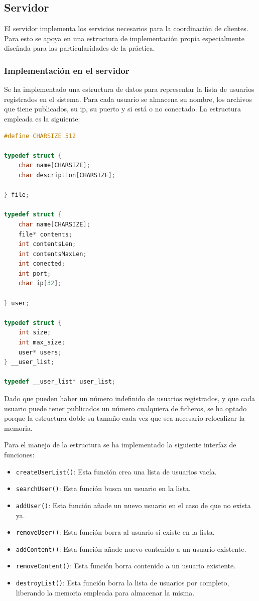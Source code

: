 \documentclass[]{article}
\begin{document}
\subsection{Servidor}
\label{subsec:servidor}
El servidor implementa los servicios necesarios para la coordinación de clientes. Para esto se apoya en una estructura de implementación propia especialmente diseñada para las particularidades de la práctica. 

\subsubsection{Implementación en el servidor}
\label{subsec:implementacion_servidor}
Se ha implementado una estructura de datos para representar la lista de usuarios registrados en el sistema. Para cada usuario se almacena su nombre, los archivos que tiene publicados, su ip, su puerto y si está o no conectado. La estructura empleada es la siguiente: 

\begin{lstlisting}[language=C, caption=Estructura de datos para el servidor]
#define CHARSIZE 512

typedef struct {
    char name[CHARSIZE];
    char description[CHARSIZE];

} file;

typedef struct {
    char name[CHARSIZE];
    file* contents;
    int contentsLen;
    int contentsMaxLen;
    int conected;
    int port;
    char ip[32];

} user;

typedef struct {
    int size;
    int max_size;
    user* users;
} __user_list;

typedef __user_list* user_list;

\end{lstlisting}

Dado que pueden haber un número indefinido de usuarios registrados, y que cada usuario puede tener publicados un número cualquiera de ficheros, se ha optado porque la estructura doble su tamaño cada vez que sea necesario relocalizar la memoria.

Para el manejo de la estructura se ha implementado la siguiente interfaz de funciones: 

\begin{itemize}
  \item \texttt{createUserList()}: Esta función crea una lista de usuarios vacía.
  \item \texttt{searchUser()}: Esta función busca un usuario en la lista.
  \item \texttt{addUser()}: Esta función añade un nuevo usuario en el caso de que no exista ya.
  \item \texttt{removeUser()}: Esta función borra al usuario si existe en la lista.
  \item \texttt{addContent()}: Esta función añade nuevo contenido a un usuario existente.
  \item \texttt{removeContent()}: Esta función borra contenido a un usuario existente.
  \item \texttt{destroyList()}: Esta función borra la lista de usuarios por completo, liberando la memoria empleada para almacenar la misma.
\end{itemize}
\end{document}
